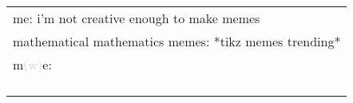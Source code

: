 \documentclass{standalone}
\begin{document}
\begin{tabular}{l}
  me: i'm not creative enough to make memes \\[.5ex]
  mathematical mathematics memes: *tikz memes trending* \\[.5ex]
  m\textcolor{lightgray}{(w)}e: \\
   \\[1ex]
   \\
  \\ \\
\end{tabular}
\end{document}

